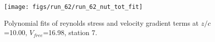 \begin{figure}[H]
\centering
\texttt{[image: figs/run\_62/run\_62\_nut\_tot\_fit]}
\caption{Polynomial fits of reynolds stress and velocity gradient terms at $z/c$=10.00, $V_{free}$=16.98, station 7.}
\label{fig:run_62_nut_tot_fit}
\end{figure}


